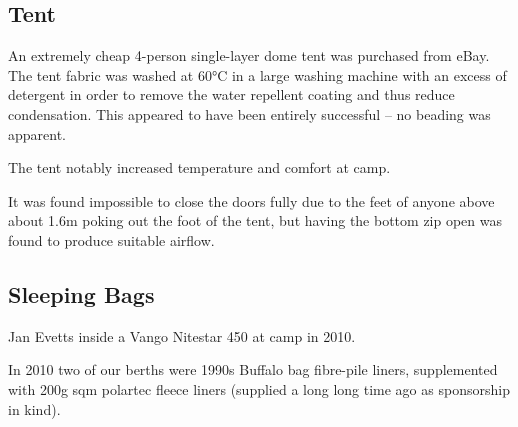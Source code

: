 \subsection{Tent}

An extremely cheap 4-person single-layer dome tent was purchased from eBay. The tent fabric was washed at 60°C in a large washing machine with an excess of detergent in order to remove the water repellent coating and thus reduce condensation. This appeared to have been entirely successful -- no beading was apparent.

The tent notably increased temperature and comfort at camp.

It was found impossible to close the doors fully due to the feet of
anyone above about 1.6m poking out the foot of the tent, but having the
bottom zip open was found to produce suitable airflow.


\subsection{Sleeping Bags}

\begin{marginfigure}
\checkoddpage \ifoddpage \forcerectofloat \else \forceversofloat \fi
\centering
 \caption{Jan Evetts inside a Vango Nitestar 450 at camp \protect{} in 2010. }
 \label{nitestar 450}
\end{marginfigure}

In 2010 two of our berths were 1990s Buffalo bag fibre-pile liners, supplemented with 200g sqm polartec fleece liners (supplied a long long time ago as sponsorship in kind).


